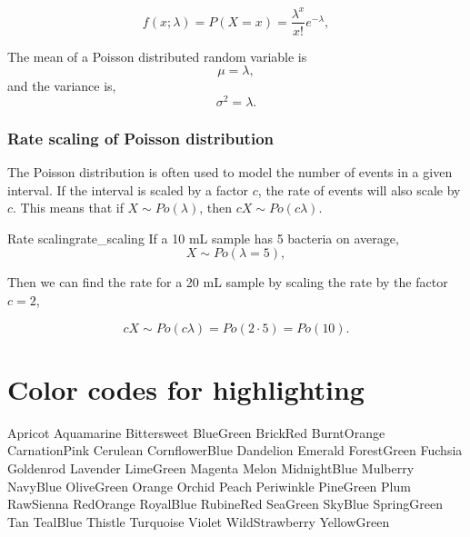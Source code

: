\begin{equation}
f(x;\lambda) = P(X=x) = \frac{\lambda^x}{x!} e^{-\lambda},
\end{equation}

The mean of a Poisson distributed random variable is
\begin{equation}
\mu = \lambda,
\end{equation}
and the variance is,
\begin{equation}
\sigma^2 = \lambda.
\end{equation}

\subsubsection{Rate scaling of Poisson distribution}

The Poisson distribution is often used to model the number of events in a given interval. If the interval is scaled by a factor $c$, the rate of events will also scale by $c$. This means that if $X \sim Po(\lambda)$, then $cX \sim Po(c\lambda)$.

\begin{example}{Rate scaling}{rate_scaling}
If a 10 mL sample has 5 bacteria on average,
\begin{equation*}
X \sim Po(\lambda = 5),
\end{equation*}

Then we can find the rate for a 20 mL sample by scaling the rate by the factor $c = 2$,

\begin{equation*}
cX \sim Po(c\lambda) = Po(2 \cdot 5) = Po(10).
\end{equation*}
\end{example}

\section{Color codes for highlighting}
Apricot
Aquamarine
Bittersweet
BlueGreen
BrickRed
BurntOrange
CarnationPink
Cerulean
CornflowerBlue
Dandelion
Emerald
ForestGreen
Fuchsia
Goldenrod
Lavender
LimeGreen
Magenta
Melon
MidnightBlue
Mulberry
NavyBlue
OliveGreen
Orange
Orchid
Peach
Periwinkle
PineGreen
Plum
RawSienna
RedOrange
RoyalBlue
RubineRed
SeaGreen
SkyBlue
SpringGreen
Tan
TealBlue
Thistle
Turquoise
Violet
WildStrawberry
YellowGreen





